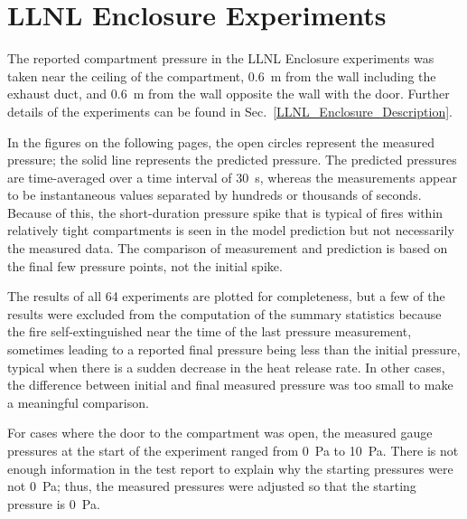 \clearpage

\section{LLNL Enclosure Experiments}

The reported compartment pressure in the LLNL Enclosure experiments was taken near the ceiling of the compartment, 0.6~m from the wall including the exhaust duct, and 0.6~m from the wall opposite the wall with the door. Further details of the experiments can be found in Sec.~\ref{LLNL_Enclosure_Description}.

In the figures on the following pages, the open circles represent the measured pressure; the solid line represents the predicted pressure. The predicted pressures are time-averaged over a time interval of 30~s, whereas the measurements appear to be instantaneous values separated by hundreds or thousands of seconds. Because of this, the short-duration pressure spike that is typical of fires within relatively tight compartments is seen in the model prediction but not necessarily the measured data. The comparison of measurement and prediction is based on the final few pressure points, not the initial spike.

The results of all 64 experiments are plotted for completeness, but a few of the results were excluded from the computation of the summary statistics because the fire self-extinguished near the time of the last pressure measurement, sometimes leading to a reported final pressure being less than the initial pressure, typical when there is a sudden decrease in the heat release rate. In other cases, the difference between initial and final measured pressure was too small to make a meaningful comparison.

For cases where the door to the compartment was open, the measured gauge pressures at the start of the experiment ranged from 0~Pa to 10~Pa. There is not enough information in the test report to explain why the starting pressures were not 0~Pa; thus, the measured pressures were adjusted so that the starting pressure is 0~Pa.

\newpage


